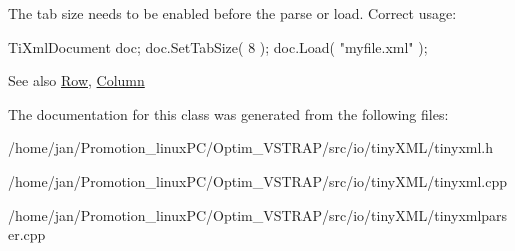 The tab size needs to be enabled before the parse or load. Correct usage\+: \begin{DoxyVerb}TiXmlDocument doc;
doc.SetTabSize( 8 );
doc.Load( "myfile.xml" );
\end{DoxyVerb}


\begin{DoxySeeAlso}{See also}
\hyperlink{classTiXmlBase_ad0cacca5d76d156b26511f46080b442e}{Row}, \hyperlink{classTiXmlBase_ad283b95d9858d5d78c334f4a61b07bb4}{Column} 
\end{DoxySeeAlso}


The documentation for this class was generated from the following files\+:\begin{DoxyCompactItemize}
\item 
/home/jan/\+Promotion\+\_\+linux\+P\+C/\+Optim\+\_\+\+V\+S\+T\+R\+A\+P/src/io/tiny\+X\+M\+L/tinyxml.\+h\item 
/home/jan/\+Promotion\+\_\+linux\+P\+C/\+Optim\+\_\+\+V\+S\+T\+R\+A\+P/src/io/tiny\+X\+M\+L/tinyxml.\+cpp\item 
/home/jan/\+Promotion\+\_\+linux\+P\+C/\+Optim\+\_\+\+V\+S\+T\+R\+A\+P/src/io/tiny\+X\+M\+L/tinyxmlparser.\+cpp\end{DoxyCompactItemize}
